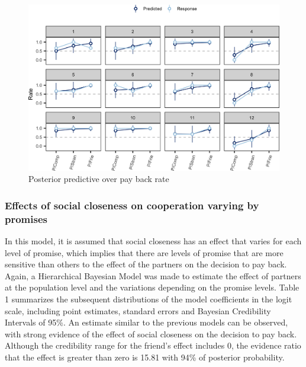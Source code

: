 \documentclass[12pt,]{article}
\begin{document}
\begin{figure}

{\centering \includegraphics[width=1\linewidth,height=1\textheight]{article_english_files/figure-latex/fig5-1} 

}

\caption{Posterior predictive over pay back rate}\label{fig:fig5}
\end{figure}

\hypertarget{effects-of-social-closeness-on-cooperation-varying-by-promises}{%
\subsubsection{Effects of social closeness on cooperation varying by
promises}\label{effects-of-social-closeness-on-cooperation-varying-by-promises}}

In this model, it is assumed that social closeness has an effect that
varies for each level of promise, which implies that there are levels of
promise that are more sensitive than others to the effect of the
partners on the decision to pay back. Again, a Hierarchical Bayesian
Model was made to estimate the effect of partners at the population
level and the variations depending on the promise levels. Table 1
summarizes the subsequent distributions of the model coefficients in the
logit scale, including point estimates, standard errors and Bayesian
Credibility Intervals of 95\%. An estimate similar to the previous
models can be observed, with strong evidence of the effect of social
closeness on the decision to pay back. Although the credibility range
for the friend's effect includes 0, the evidence ratio that the effect
is greater than zero is 15.81 with 94\% of posterior probability.
\end{document}
